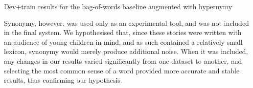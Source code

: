 \begin{table}[h]
\centering

\caption{\label{fig:resultHypDev} Dev+train results for the bag-of-words baseline augmented with hypernymy}
\end{table}

Synonymy, however, was used only as an experimental tool, and was not included in the final system. We hypothesised that, since these stories were written with an audience of young children in mind, and as such contained a relatively small lexicon, synonymy would merely produce additional noise. When it was included, any changes in our results varied significantly from one dataset to another, and selecting the most common sense of a word provided more accurate and stable results, thus confirming our hypothesis.